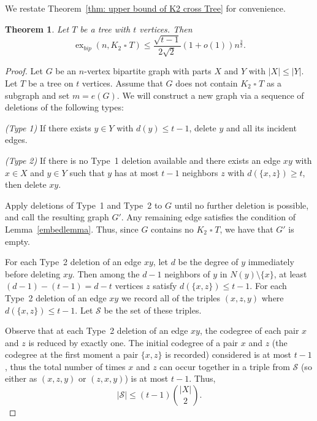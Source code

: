 \documentclass[11pt,a4paper]{article}
\newtheorem{theorem}{Theorem}[section]
\theoremstyle{definition}
\DeclareMathOperator{\ex}{ex}
\begin{document}
        We restate Theorem~\ref{thm: upper bound of K2 cross Tree} for convenience.

        \begin{theorem}\label{thm: upper bound of K2 cross Tree Restate}
            Let $T$ be a tree with $t$ vertices.
            Then
            $$\ex_{bip}(n,K_2 \mathbin{\square} T)\leq \frac{\sqrt{t-1}}{2\sqrt{2}}(1+o(1)) n^{\frac{3}{2}}.$$
        \end{theorem}

\begin{proof}
Let $G$ be an $n$-vertex bipartite graph with parts $X$ and $Y$ with $|X|\le |Y|$. Let $T$ be a tree on $t$ vertices. Assume that $G$ does not contain $K_2 \mathbin{\square} T$ as a subgraph and set $m= e(G)$. We will construct a new graph via a sequence of deletions of the following types: 

\smallskip
\emph{(Type 1)} If there exists $y\in Y$ with $d(y) \le t-1$, delete $y$ and all its incident edges.

\smallskip
\emph{(Type 2)} If there is no Type~1 deletion available and there exists an edge $xy$ with $x\in X$ and $y\in Y$ such that $y$ has at most $t-1$ neighbors $z$ with $d(\{x,z\})\ge t$, then delete $xy$.

\smallskip
Apply deletions of Type~1 and Type~2 to $G$ until no further deletion is possible, and call the resulting graph $G'$. Any remaining edge satisfies the condition of Lemma~\ref{embedlemma}. Thus, since $G$ contains no $K_2 \mathbin{\square} T$, we have that $G'$ is empty.

For each Type~2 deletion of an edge $xy$, let $d$ be the degree of $y$ immediately before deleting $xy$.  Then among the $d-1$ neighbors of $y$ in $N(y)\setminus \{x\}$, at least $(d-1)-(t-1)=d-t$ vertices $z$ satisfy $d(\{x,z\})\le t-1$. For each Type~2 deletion of an edge $xy$ we record all of the triples $(x,z,y)$ where $d(\{x,z\})\le t-1$. Let $\mathcal{S}$ be the set of these triples. 

Observe that at each Type~2 deletion of an edge $xy$, the codegree of each pair $x$ and $z$ is reduced by exactly one. The initial codegree of a pair $x$ and $z$ (the codegree at the first moment a pair $\{x, z\}$ is recorded) considered is at most $t-1$, thus the total number of times $x$ and $z$ can occur together in a triple from $\mathcal{S}$ (so either as $(x,z,y)$ or $(z,x,y)$) is at most $t-1$. Thus,
\begin{equation}\label{uppereq}
|\mathcal{S}|\le (t-1)\binom{|X|}{2}.
\end{equation}


\end{proof}
\end{document}
